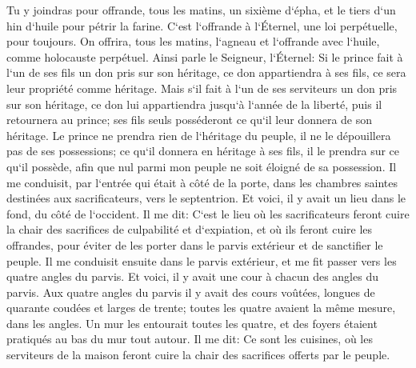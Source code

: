 \verse Tu y joindras pour offrande, tous les matins, un sixième d`épha, et le tiers d`un hin d`huile pour pétrir la farine. C`est l`offrande à l`Éternel, une loi perpétuelle, pour toujours. 
\verse On offrira, tous les matins, l`agneau et l`offrande avec l`huile, comme holocauste perpétuel. 
\verse Ainsi parle le Seigneur, l`Éternel: Si le prince fait à l`un de ses fils un don pris sur son héritage, ce don appartiendra à ses fils, ce sera leur propriété comme héritage. 
\verse Mais s`il fait à l`un de ses serviteurs un don pris sur son héritage, ce don lui appartiendra jusqu`à l`année de la liberté, puis il retournera au prince; ses fils seuls posséderont ce qu`il leur donnera de son héritage. 
\verse Le prince ne prendra rien de l`héritage du peuple, il ne le dépouillera pas de ses possessions; ce qu`il donnera en héritage à ses fils, il le prendra sur ce qu`il possède, afin que nul parmi mon peuple ne soit éloigné de sa possession. 
\verse Il me conduisit, par l`entrée qui était à côté de la porte, dans les chambres saintes destinées aux sacrificateurs, vers le septentrion. Et voici, il y avait un lieu dans le fond, du côté de l`occident. 
\verse Il me dit: C`est le lieu où les sacrificateurs feront cuire la chair des sacrifices de culpabilité et d`expiation, et où ils feront cuire les offrandes, pour éviter de les porter dans le parvis extérieur et de sanctifier le peuple. 
\verse Il me conduisit ensuite dans le parvis extérieur, et me fit passer vers les quatre angles du parvis. Et voici, il y avait une cour à chacun des angles du parvis. 
\verse Aux quatre angles du parvis il y avait des cours voûtées, longues de quarante coudées et larges de trente; toutes les quatre avaient la même mesure, dans les angles. 
\verse Un mur les entourait toutes les quatre, et des foyers étaient pratiqués au bas du mur tout autour. 
\verse Il me dit: Ce sont les cuisines, où les serviteurs de la maison feront cuire la chair des sacrifices offerts par le peuple. 

